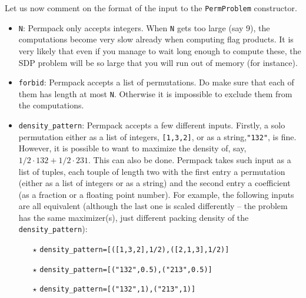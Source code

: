 Let us now comment on the format of the input to the \texttt{PermProblem} constructor. 
\begin{itemize}
\item \texttt{N}: Permpack only accepts integers. When \texttt{N} gets too large (say 9), the computations become very slow already when computing flag products. It is very likely that even if you manage to wait long enough to compute these, the SDP problem will be so large that you will run out of memory (for instance).
\item \texttt{forbid}: Permpack accepts a list of permutations. Do make sure that each of them has length at most \texttt{N}. Otherwise it is impossible to exclude them from the computations.
\item \texttt{density\_pattern}: Permpack accepts a few different inputs. Firstly, a solo permutation either as a list of integers, \texttt{[1,3,2]}, or as a string,\texttt{"132"}, is fine. However, it is possible to want to maximize the density of, say, $1/2\cdot 132 + 1/2\cdot 231$. This can also be done. Permpack takes such input as a list of tuples, each touple of length two with the first entry a permutation (either as a list of integers or as a string) and the second entry a coefficient (as a fraction or a floating point number). For example, the following inputs are all equivalent (although the last one is scaled differently -- the problem has the same maximizer(s), just different packing density of the \texttt{density\_pattern}):
\begin{itemize}
\item[$\star$] \texttt{density\_pattern=[([1,3,2],1/2),([2,1,3],1/2)]}
\item[$\star$] \texttt{density\_pattern=[("132",0.5),("213",0.5)]}
\item[$\star$] \texttt{density\_pattern=[("132",1),("213",1)]}
\end{itemize}
\end{itemize}

